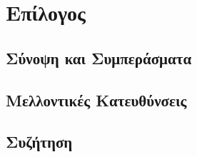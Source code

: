 \chapter{Επίλογος}

\section{Σύνοψη και Συμπεράσματα}

\section{Μελλοντικές Κατευθύνσεις}

\section{Συζήτηση}